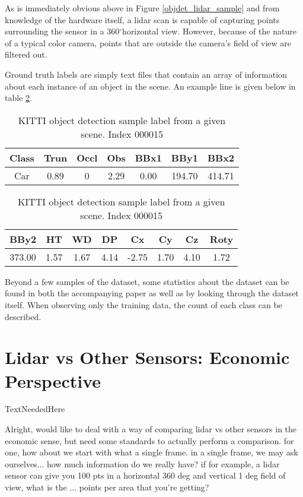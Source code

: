 \def \DEG{$^{\circ}$} %

As is immediately obvious above in Figure \ref{objdet_lidar_sample} and from knowledge of the hardware itself, a lidar scan is capable of capturing points surrounding the sensor in a 360\DEG horizontal view. However, because of the nature of a typical color camera, points that are outside the camera's field of view are filtered out. 

Ground truth labels are simply text files that contain an array of information about each instance of an object in the scene. An example line is given below in table \ref{kitti_label_sample}. 


\begin{table}[h]
\centering
\caption{KITTI object detection sample label from a given scene. Index 000015}
\begin{tabular}{|c|c|c|c|c|c|c|}
\hline
Class & Trun & Occl & Obs  & BBx1  & BBy1   & BBx2  \\
\hline
Car   & 0.89       & 0         & 2.29 & 0.00  & 194.70 & 414.71 \\
\hline
\end{tabular}
\begin{tabular}{|c|c|c|c|c|c|c|c|}
\hline
BBy2   & HT   & WD   & DP   & Cx    & Cy   & Cz   & Roty \\
\hline
373.00 & 1.57 & 1.67 & 4.14 & -2.75 & 1.70 & 4.10 & 1.72 \\
\hline
\end{tabular}
\label{kitti_label_sample}
\end{table}


Beyond a few samples of the dataset, some statistics about the dataset can be found in both the accompanying paper as well as by looking through the dataset itself. When observing only the training data, the count of each class can be described. 


\newpage
\section{Lidar vs Other Sensors: Economic Perspective}
\label{AppendixLidar}
TextNeededHere


Alright, would like to deal with a way of comparing lidar vs other sensors in the economic sense, but need some standards to actually perform a comparison. for one, how about we start with what a single frame. in a single frame, we may ask ourselves... how much information do we really have? if for example, a lidar sensor can give you 100 pts in a horizontal 360 deg and vertical 1 deg field of view, what is the ... points per area that you're getting? 


